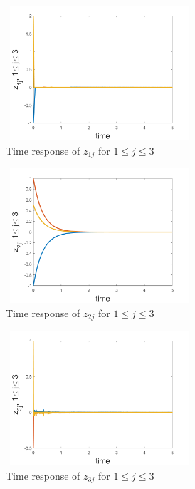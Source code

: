 \documentclass[letterpaper, 10 pt, conference]{ieeeconf}  %
\begin{document}
\begin{figure}
\includegraphics[width=7cm,height=5cm]{z1}
\caption{Time response of $z_{1j}$ for $1\leq j\leq
3$\label{z1}}
\end{figure}
\begin{figure}
\includegraphics[width=7cm,height=5cm]{z2}
\caption{Time response of $z_{2j}$ for $1\leq j\leq
3$\label{z2}}
\end{figure}
%

\begin{figure}
\includegraphics[width=7cm,height=5cm]{z3}
\caption{Time response of $z_{3j}$ for $1\leq j\leq
3$\label{z3}}
\end{figure}
\end{document}
